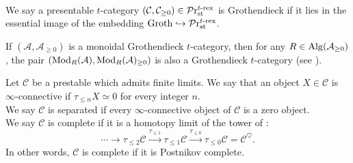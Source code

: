 \documentclass[a4paper,10pt, oneside]{amsart}
\begin{document}
	\begin{cor}\label{pret}\,
	\end{cor}
	
	\begin{de}\label{gro}
		We say a presentable $t$-category $(\mathcal{C},\mathcal{C}_{\geq0})\in \mathcal{P}\mathrm{r}^{t\text{-rex}}_{\mathrm{st}}$ is Grothendieck if it lies in the essential image of the embedding $\mathrm{Groth}\hookrightarrow \mathcal{P}\mathrm{r}^{t\text{-rex}}_{\mathrm{st}}$.
	\end{de}
	
	\begin{exam}
		If $(\mathcal{A},\mathcal{A}_{\geq0})$ is a  monoidal Grothendieck $t$-category, then for any $R\in \operatorname{Alg}(\mathcal{A}_{\geq0})$, the pair $(\operatorname{Mod}_R(\mathcal{A}),\operatorname{Mod}_R(\mathcal{A})_{\geq0})$ is also a Grothendieck $t$-category (see \cite[Proposition 2.7]{hattt}).
	\end{exam}
	
	\begin{de}
		Let $\mathcal{C}$ be a prestable \infcat which admits finite limits. We say that an object $X \in \mathcal{C}$ is $\infty$-connective if $\tau_{\leq n} X \simeq 0$ for every integer $n$. \\
		We say $\mathcal{C}$ is separated if every $\infty$-connective object of $\mathcal{C}$ is a zero object. \\
		We say $\mathcal{C}$ is complete if it is a homotopy limit of the tower of \infcats:
		$$
		\cdots \rightarrow \tau_{\leq 2} \mathcal{C} \xrightarrow{\tau_{\leq 1}} \tau_{\leq 1} \mathcal{C} \xrightarrow{\tau_{\leq 0}} \tau_{\leq 0} \mathcal{C}=\mathcal{C}^{\heartsuit} .
		$$
		In other words, $\mathcal{C}$ is complete if it is Postnikov complete.
	\end{de}
	
\end{document}
